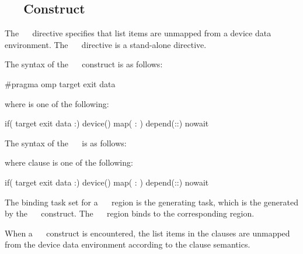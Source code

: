 \subsection{~~ Construct}
\label{subsec:target exit data Construct}
\summary
The ~~ directive specifies that list items are unmapped from a device data environment. The ~~ directive is a stand-alone directive.
\syntax
\begin{ccppspecific}
The syntax of the ~~ construct is as follows:
\begin{ompcPragma}
#pragma omp target exit data 
\end{ompcPragma}
where  is one of the following:
\begin{indentedcodelist}
if(\plc{[} target exit data :\plc{] scalar-expression})
device()
map(\plc{[ [map-type-modifier[,]] map-type} : \plc{] list})
depend(\plc{[depend-modifier}:\plc{]dependence-type }:)
nowait
\end{indentedcodelist}
\end{ccppspecific}
\begin{fortranspecific}
The syntax of the ~~ is as follows:
where clause is one of the following:
\begin{indentedcodelist}
if(\plc{[} target exit data :\plc{] scalar-logical-expression})
device()
map(\plc{[ [map-type-modifier[,]] map-type} : \plc{] list})
depend(\plc{[depend-modifier}:\plc{]dependence-type }:)
nowait
\end{indentedcodelist}
\end{fortranspecific}

\binding
The binding task set for a ~~ region is
the generating task, which is the  generated by the
~~ construct. The
~~ region binds to the corresponding
 region.

\descr
When a ~~ construct is encountered, the list items in the  clauses are unmapped from the device data environment according to the  clause semantics.

